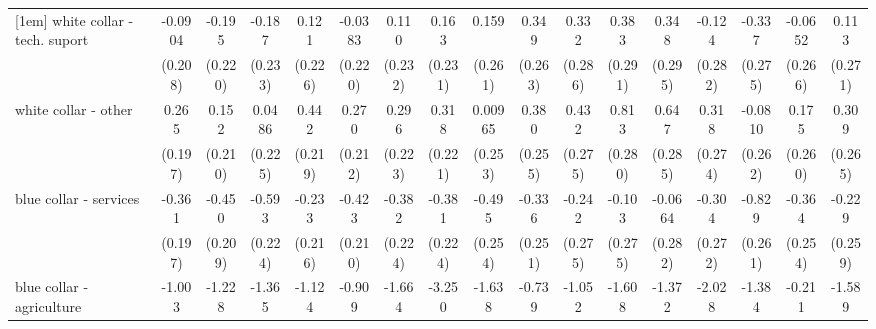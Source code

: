 {\begin{tabular}{l*{16}{c}}
[1em]
white collar - tech. suport&     -0.0904         &      -0.195         &      -0.187         &       0.121         &     -0.0383         &       0.110         &       0.163         &       0.159         &       0.349         &       0.332         &       0.383         &       0.348         &      -0.124         &      -0.337         &     -0.0652         &       0.113         \\
                    &     (0.208)         &     (0.220)         &     (0.233)         &     (0.226)         &     (0.220)         &     (0.232)         &     (0.231)         &     (0.261)         &     (0.263)         &     (0.286)         &     (0.291)         &     (0.295)         &     (0.282)         &     (0.275)         &     (0.266)         &     (0.271)         \\
[1em]
white collar - other&       0.265         &       0.152         &      0.0486         &       0.442\sym{*}  &       0.270         &       0.296         &       0.318         &     0.00965         &       0.380         &       0.432         &       0.813\sym{**} &       0.647\sym{*}  &       0.318         &     -0.0810         &       0.175         &       0.309         \\
                    &     (0.197)         &     (0.210)         &     (0.225)         &     (0.219)         &     (0.212)         &     (0.223)         &     (0.221)         &     (0.253)         &     (0.255)         &     (0.275)         &     (0.280)         &     (0.285)         &     (0.274)         &     (0.262)         &     (0.260)         &     (0.265)         \\
[1em]
blue collar - services&      -0.361         &      -0.450\sym{*}  &      -0.593\sym{**} &      -0.233         &      -0.423\sym{*}  &      -0.382         &      -0.381         &      -0.495         &      -0.336         &      -0.242         &      -0.103         &     -0.0664         &      -0.304         &      -0.829\sym{**} &      -0.364         &      -0.229         \\
                    &     (0.197)         &     (0.209)         &     (0.224)         &     (0.216)         &     (0.210)         &     (0.224)         &     (0.224)         &     (0.254)         &     (0.251)         &     (0.275)         &     (0.275)         &     (0.282)         &     (0.272)         &     (0.261)         &     (0.254)         &     (0.259)         \\
[1em]
blue collar - agriculture&      -1.003         &      -1.228         &      -1.365\sym{*}  &      -1.124         &      -0.909         &      -1.664\sym{*}  &      -3.250\sym{***}&      -1.638\sym{**} &      -0.739         &      -1.052         &      -1.608\sym{*}  &      -1.372         &      -2.028\sym{*}  &      -1.384\sym{*}  &      -0.211         &      -1.589\sym{**} \\

\end{tabular}}

